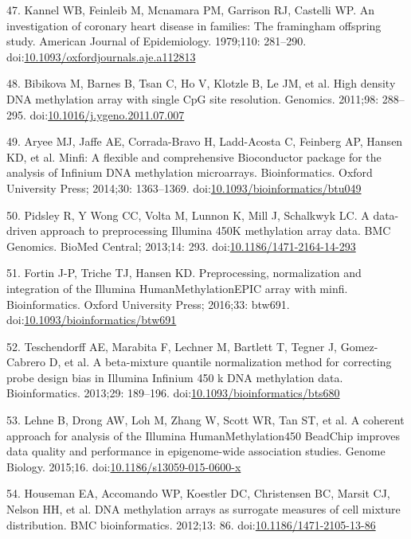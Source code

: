 \documentclass[]{article}
\theoremstyle{definition}
\theoremstyle{definition}
\theoremstyle{definition}
\theoremstyle{remark}
\begin{document}
47. Kannel WB, Feinleib M, Mcnamara PM, Garrison RJ, Castelli WP. An
investigation of coronary heart disease in families: The framingham
offspring study. American Journal of Epidemiology. 1979;110: 281--290.
doi:\href{http://dx.doi.org/10.1093/oxfordjournals.aje.a112813}{10.1093/oxfordjournals.aje.a112813}

48. Bibikova M, Barnes B, Tsan C, Ho V, Klotzle B, Le JM, et al. High
density DNA methylation array with single CpG site resolution. Genomics.
2011;98: 288--295.
doi:\href{http://dx.doi.org/10.1016/j.ygeno.2011.07.007}{10.1016/j.ygeno.2011.07.007}

49. Aryee MJ, Jaffe AE, Corrada-Bravo H, Ladd-Acosta C, Feinberg AP,
Hansen KD, et al. Minfi: A flexible and comprehensive Bioconductor
package for the analysis of Infinium DNA methylation microarrays.
Bioinformatics. Oxford University Press; 2014;30: 1363--1369.
doi:\href{http://dx.doi.org/10.1093/bioinformatics/btu049}{10.1093/bioinformatics/btu049}

50. Pidsley R, {Y Wong} CC, Volta M, Lunnon K, Mill J, Schalkwyk LC. A
data-driven approach to preprocessing Illumina 450K methylation array
data. BMC Genomics. BioMed Central; 2013;14: 293.
doi:\href{http://dx.doi.org/10.1186/1471-2164-14-293}{10.1186/1471-2164-14-293}

51. Fortin J-P, Triche TJ, Hansen KD. Preprocessing, normalization and
integration of the Illumina HumanMethylationEPIC array with minfi.
Bioinformatics. Oxford University Press; 2016;33: btw691.
doi:\href{http://dx.doi.org/10.1093/bioinformatics/btw691}{10.1093/bioinformatics/btw691}

52. Teschendorff AE, Marabita F, Lechner M, Bartlett T, Tegner J,
Gomez-Cabrero D, et al. A beta-mixture quantile normalization method for
correcting probe design bias in Illumina Infinium 450 k DNA methylation
data. Bioinformatics. 2013;29: 189--196.
doi:\href{http://dx.doi.org/10.1093/bioinformatics/bts680}{10.1093/bioinformatics/bts680}

53. Lehne B, Drong AW, Loh M, Zhang W, Scott WR, Tan ST, et al. A
coherent approach for analysis of the Illumina HumanMethylation450
BeadChip improves data quality and performance in epigenome-wide
association studies. Genome Biology. 2015;16.
doi:\href{http://dx.doi.org/10.1186/s13059-015-0600-x}{10.1186/s13059-015-0600-x}

54. Houseman EA, Accomando WP, Koestler DC, Christensen BC, Marsit CJ,
Nelson HH, et al. DNA methylation arrays as surrogate measures of cell
mixture distribution. BMC bioinformatics. 2012;13: 86.
doi:\href{http://dx.doi.org/10.1186/1471-2105-13-86}{10.1186/1471-2105-13-86}
\end{document}

